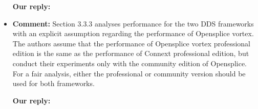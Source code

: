 \documentclass{article}
\begin{document}
\begin{itemize}
  \begin{flushleft}
    \textbf{Our reply:}
  \end{flushleft}


\item \begin{flushleft}
    \textbf{Comment:} Section 3.3.3 analyses performance for the two DDS frameworks with an explicit assumption regarding the performance of Opensplice vortex. The authors assume that the performance of Opensplice vortex professional edition is the same as
    the performance of Connext professional edition, but conduct their experiments only with the community edition of Opensplice. For a fair analysis, either the professional or community version should be used for both frameworks.
  \end{flushleft}

  \begin{flushleft}
    \textbf{Our reply:}
  \end{flushleft}

\end{itemize}

\newpage
\end{document}
